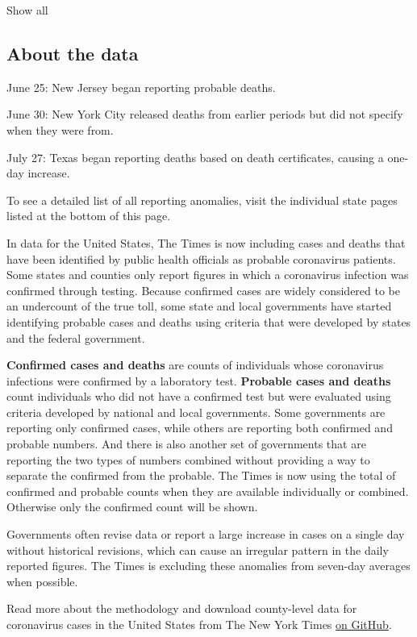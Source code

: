 Show all

\hypertarget{about-the-data}{%
\subsection{About the data}\label{about-the-data}}

June 25: New Jersey began reporting probable deaths.

June 30: New York City released deaths from earlier periods but did not
specify when they were from.

July 27: Texas began reporting deaths based on death certificates,
causing a one-day increase.

To see a detailed list of all reporting anomalies, visit the individual
state pages listed at the bottom of this page.

In data for the United States, The Times is now including cases and
deaths that have been identified by public health officials as probable
coronavirus patients. Some states and counties only report figures in
which a coronavirus infection was confirmed through testing. Because
confirmed cases are widely considered to be an undercount of the true
toll, some state and local governments have started identifying probable
cases and deaths using criteria that were developed by states and the
federal government.

\textbf{Confirmed cases and deaths} are counts of individuals whose
coronavirus infections were confirmed by a laboratory test.
\textbf{Probable cases and deaths} count individuals who did not have a
confirmed test but were evaluated using criteria developed by national
and local governments. Some governments are reporting only confirmed
cases, while others are reporting both confirmed and probable numbers.
And there is also another set of governments that are reporting the two
types of numbers combined without providing a way to separate the
confirmed from the probable. The Times is now using the total of
confirmed and probable counts when they are available individually or
combined. Otherwise only the confirmed count will be shown.

Governments often revise data or report a large increase in cases on a
single day without historical revisions, which can cause an irregular
pattern in the daily reported figures. The Times is excluding these
anomalies from seven-day averages when possible.

Read more about the methodology and download county-level data for
coronavirus cases in the United States from The New York Times
\href{https://github.com/nytimes/covid-19-data}{on GitHub}.

